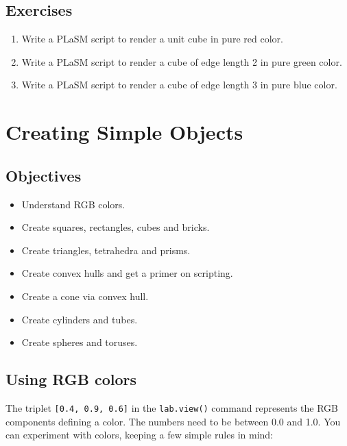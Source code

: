 \documentclass{article}
\begin{document}
\subsection{Exercises}

\begin{enumerate}
\item Write a PLaSM script to render a unit cube in pure red color.
\item Write a PLaSM script to render a cube of edge length 2 in pure green color.
\item Write a PLaSM script to render a cube of edge length 3 in pure blue color.
\end{enumerate}

\newpage
\section{Creating Simple Objects}

\subsection{Objectives}
\begin{itemize}
\item Understand RGB colors.
\item Create squares, rectangles, cubes and bricks.
\item Create triangles, tetrahedra and prisms.
\item Create convex hulls and get a primer on scripting.
\item Create a cone via convex hull.
\item Create cylinders and tubes.
\item Create spheres and toruses.
\end{itemize}


\subsection{Using RGB colors} \label{subsec:colors}

The triplet {\tt [0.4, 0.9, 0.6]} in the {\tt lab.view()} command
represents the RGB components defining a color. The numbers need to be between 
0.0 and 1.0. You can experiment with colors, keeping a few simple rules in mind:
\end{document}
